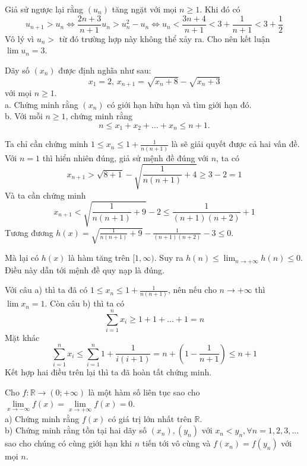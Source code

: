 \documentclass[11pt]{scrartcl}
\begin{document}
\begin{itemize}[label=, leftmargin=0em, itemsep=0.5em]
\begin{sol}
        Giả sử ngược lại rằng $(u_n)$ tăng ngặt với mọi $n \geq 1$. Khi đó có $$u_{n + 1} > u_n \Leftrightarrow \frac{2n + 3}{n + 1}u_n  > u_n^2 - u_n \Leftrightarrow u_n < \frac{3n + 4}{n + 1} < 3 + \frac{1}{n + 1} < 3 + \frac{1}{2} $$
        Vô lý vì $u_n >$ từ đó trường hợp này không thể xảy ra. Cho nên kết luận $\lim u_n = 3$.
    \end{sol}
    \begin{bt}
        Dãy số $(x_n)$ được định nghĩa như sau:
$$x_1=2,\, x_{n+1}=\sqrt{x_n+8}-\sqrt{x_n+3}$$ với mọi $n\geq 1$.\\
a. Chứng minh rằng $(x_n)$ có giới hạn hữu hạn và tìm giới hạn đó.\\
b. Với mỗi $n\geq 1$, chứng minh rằng
$$n\leq x_1+x_2+\dots +x_n\leq n+1.$$
    \end{bt}

    \begin{sol}
        Ta chỉ cần chứng minh $1 \leq x_n \leq 1 + \frac{1}{n(n + 1)}$ là sẽ giải quyết được cả hai vấn đề. Với $n = 1$ thì hiển nhiên đúng, giả sử mệnh đề đúng với $n$, ta có 
        $$x_{n + 1} > \sqrt{8 + 1} - \sqrt{\frac{1}{n(n+1)} + 4} \geq 3 - 2 = 1$$
        Và ta cần chứng minh
        $$x_{n + 1} < \sqrt{\frac{1}{n(n+1)} + 9 } - 2 \leq \frac{1}{(n+1)(n + 2)} + 1
        $$
        Tương đương $h(x) = \sqrt{\frac{1}{n(n+1)} + 9 } - \frac{1}{(n+1)(n + 2)} - 3 \leq 0$.


        Mà lại có  $h(x)$ là hàm tăng trên $[1,\infty)$. Suy ra $\displaystyle h(n) \leq \lim_{n\to +\infty} h(n) \leq 0$. Điều này dẫn tới mệnh đề quy nạp là đúng. 


        Với câu a) thì ta đã có $1 \leq x_n \leq 1 + \frac{1}{n(n + 1)}$, nên nếu cho $n \to +\infty$ thì $\lim x_n = 1$.
        Còn câu b) thì ta có 
        $$
        \sum_{i = 1}^n x_i \geq 1 + 1 + ... + 1 = n
        $$
        Mặt khác
        $$
        \sum_{i = 1}^n x_i \leq \sum_{i = 1}^n 1 + \frac{1}{i(i+1)} = n + (1 - \frac{1}{n + 1}) \leq n + 1
        $$
        Kết hợp hai điều trên lại thì ta đã hoàn tất chứng minh.

    \end{sol}

    \begin{bt}
        Cho $f:\mathbb{R}\to (0;+\infty)$ là một hàm số liên tục sao cho $\underset{x\to -\infty }{\mathop{\lim }}f(x)=\underset{x\to +\infty }{\mathop{\lim }}f(x)=0.$\\
a) Chứng minh rằng $f(x)$ có giá trị lớn nhất trên $\mathbb{R}.$\\
b) Chứng minh rằng tồn tại hai dãy số $({{x}_{n}}),({{y}_{n}})$ với ${{x}_{n}}<{{y}_{n}},\forall n=1,2,3,...$ sao cho chúng có cùng giới hạn khi $n$ tiến tới vô cùng và $f({{x}_{n}})=f({{y}_{n}})$ với mọi $n$.
    \end{bt}


\end{itemize}
\end{document}
